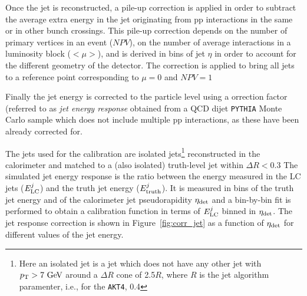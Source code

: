 
Once the jet is reconstructed, a 
pile-up correction is applied in 
order to subtract the average extra 
energy in the jet originating from pp 
interactions in the same or in other bunch crossings. 
This pile-up correction depends on the number of primary vertices in an event ($NPV$),
on the number of average interactions in 
a luminosity block ($<\mu>$), and is derived in bins of jet $\eta$ in order to
account for the different geometry of the detector. The
correction is applied to bring all jets to a 
reference point corresponding to $\mu=0$ and $NPV = 1$

Finally the jet energy is corrected to the particle
level using a orrection factor (referred to as 
{\it jet energy response} obtained from a QCD 
dijet \texttt{PYTHIA} Monte Carlo sample
which does not include
multiple pp interactions, as these have been already
corrected for.

The jets used for the calibration are isolated jets\footnote{Here an
isolated jet is a jet which does not have any other
jet with $\pt>7\gev$
around a $\Delta R$ cone of 2.5$R$, where $R$ is
the jet algorithm paramenter, i.e., for the \texttt{AKT4}, 0.4}
reconstructed in the calorimeter and matched to
a (also isolated) truth-level jet within $\Delta R<0.3$
The simulated jet energy response 
is the ratio between the energy measured in the LC jets ($E_{\rm LC}^j$)
and the truth jet energy ($E_{\rm truth}^j$). It is measured in bins of
the truth jet energy and of the calorimeter jet pseudorapidity $\eta_{\rm det}$
and a bin-by-bin fit is performed to obtain a
calibration function in terms of $E_{\rm LC}^j$
binned in $\eta_{\rm det}$.
The jet response correction is
shown in Figure~\ref{fig:corr_jet}
as a function of $\eta_{\rm det}$
for different values of the jet energy.




